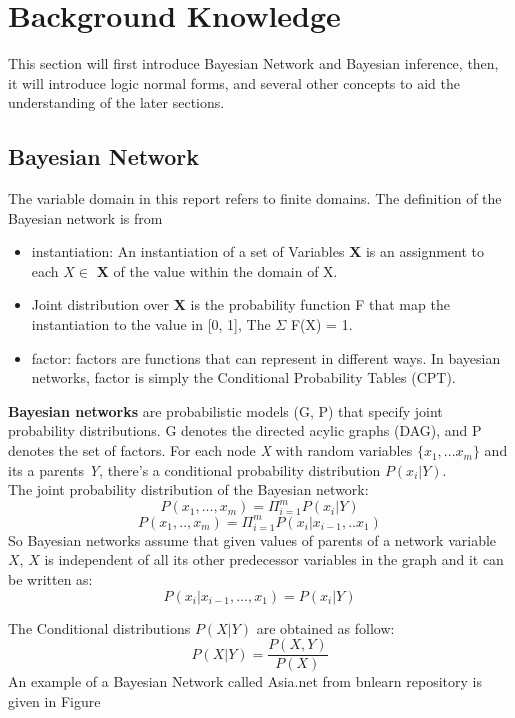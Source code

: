 \newpage
\section{Background Knowledge}
This section will first introduce Bayesian Network and Bayesian inference, then, it will introduce logic normal forms, and several other concepts to aid the understanding of the later sections.
    \subsection{Bayesian Network}
    The variable domain in this report refers to finite domains. The definition of the Bayesian network is from \cite{2008-literature-review}\\
    \begin{itemize}
        \item instantiation: An instantiation of a set of Variables \textbf{X} is an assignment to each $X \in$ \textbf{X} of the value within the domain of X.
        \item Joint distribution over \textbf{X} is the probability function F that map the instantiation to the value in [0, 1], The $\Sigma$ F(X) = 1.
        \item factor: factors are functions that can represent in different ways. In bayesian networks, factor is simply the Conditional Probability Tables (CPT).
    \end{itemize}
    \textbf{Bayesian networks} are probabilistic models (G, P) that specify joint probability distributions. G denotes the directed acylic graphs (DAG), and P denotes the set of factors. For each node \textit{X} with random variables $\{x_{1}, ... x_{m}\}$ and its a parents \textit{Y}, there's a conditional probability distribution $P(x_{i}|Y)$. \\
    
    \noindent The joint probability distribution of the Bayesian network: 
    $$P(x_{1}, ... , x_{m}) = \Pi_{i = 1}^{m} P(x_{i}|Y)$$
    $$P(x_{1},.., x_{m}) = \Pi_{i = 1}^{m}P(x_{i}|x_{i - 1}, .. x_{1})$$
    So Bayesian networks assume that given values of parents of a network variable $X$, $X$ is independent of all its other predecessor variables in the graph and it can be written as: $$P(x_{i}|x_{i- 1}, ..., x_{1}) = P(x_{i}|Y)$$
    
    \noindent The Conditional distributions $P(X|Y)$ are obtained as follow:
    $$P(X|Y) = \frac{P(X,Y)}{P(X)}$$
    An example of a Bayesian Network called Asia.net from bnlearn repository is given in Figure 
    
